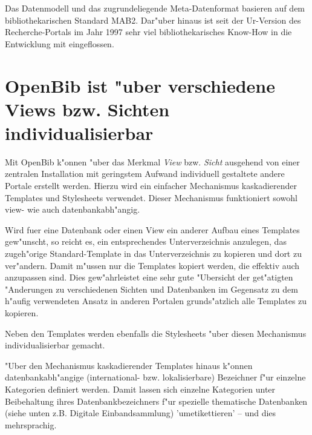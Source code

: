 \documentclass[11pt, twoside, a4paper, BCOR8mm, DIV12, bibtotoc,idxtotoc]{scrbook}
\begin{document}
Das Datenmodell und das zugrundeliegende Meta-Datenformat basieren auf
dem bibliothekarischen Standard MAB2. Dar"uber hinaus ist seit der
Ur-Version des Recherche-Portals im Jahr 1997 sehr viel
bibliothekarisches Know-How in die Entwicklung mit eingeflossen.


\section{OpenBib ist "uber verschiedene Views bzw. Sichten
  individualisierbar}
Mit OpenBib k"onnen "uber das Merkmal \textit{View}
bzw. \textit{Sicht} ausgehend von einer zentralen Installation mit
geringstem Aufwand individuell gestaltete andere Portale erstellt
werden. Hierzu wird ein einfacher Mechanismus kaskadierender Templates
und Stylesheets verwendet. Dieser Mechanismus funktioniert sowohl
view- wie auch datenbankabh"angig. 

Wird fuer eine Datenbank oder einen View ein anderer Aufbau eines
Templates gew"unscht, so reicht es, ein entsprechendes
Unterverzeichnis anzulegen, das zugeh"orige Standard-Template in das
Unterverzeichnis zu kopieren und dort zu ver"andern. Damit m"ussen nur
die Templates kopiert werden, die effektiv auch anzupassen sind. Dies
gew"ahrleistet eine sehr gute "Ubersicht der get"atigten "Anderungen
zu verschiedenen Sichten und Datenbanken im Gegensatz zu dem h"aufig
verwendeten Ansatz in anderen Portalen grunds"atzlich alle Templates
zu kopieren.

Neben den Templates werden ebenfalls die Stylesheets "uber diesen
Mechanismus individualisierbar gemacht.

"Uber den Mechanismus kaskadierender Templates hinaus k"onnen
datenbankabh"angige (international- bzw. lokalisierbare)
Bezeichner f"ur einzelne Kategorien definiert werden. Damit lassen
sich einzelne Kategorien unter Beibehaltung ihres Datenbankbezeichners
f"ur spezielle thematische Datenbanken (siehe unten z.B. Digitale
Einbandsammlung) 'umetikettieren' -- und dies mehrsprachig.
\end{document}
